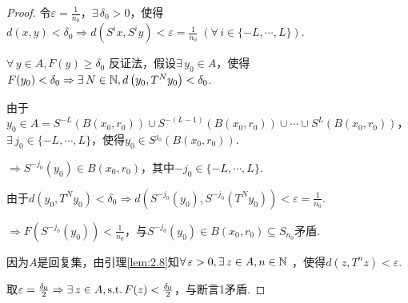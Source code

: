 \begin{proof}
    令$\varepsilon=\frac{1}{n_0}$，$\exists\,\delta_0>0$，使得$d(x,y)<\delta_0\Rightarrow d \left(S^ix,S^iy\right)<\varepsilon=\frac{1}{n_0}\;(\forall\, i\in\{-L,\cdots,L\})$.\par
    \begin{claim}{$\forall\,y\in A,F(y)\geq \delta_0$}
        反证法，假设$\exists\, y_0\in A$，使得$F(y_0)<\delta_0\Rightarrow \exists\, N\in\mathbb{N},d \left(y_0,T^Ny_0\right)<\delta_0$.\par
        由于$y_0\in A=S^{-L}\left(B(x_0,r_0)\right)\cup S^{-(L-1)}\left(B(x_0,r_0)\right)\cup\cdots\cup S^{L}\left(B(x_0,r_0)\right)$，$\exists\, j_0\in\{-L,\cdots,L\}$，使得$y_0\in S^{j_0}\left(B(x_0,r_0)\right)$.\par
        $\Rightarrow S^{-j_0}(y_0)\in B(x_0,r_0)$，其中$-j_0\in \{-L,\cdots,L\}$.\par
        由于$d \left(y_0,T^Ny_0\right)<\delta_0\Rightarrow d \left(S^{-j_0}(y_0),S^{-j_0}\left(T^Ny_0\right)\right)<\varepsilon=\frac{1}{n_0}$.\par
        $\Rightarrow F \left(S^{-j_0}(y_0)\right)<\frac{1}{n_0}$，与$S^{-j_0}(y_0)\in B(x_0,r_0)\subseteq S_{n_0}$矛盾.
    \end{claim}\par
    因为$A$是回复集，由引理\ref{lem:2.8}知$\forall\, \varepsilon>0,\exists\, z\in A,n\in\mathbb{N}$ ，使得$d \left(z,T^nz\right)<\varepsilon$.\par
    取$\varepsilon=\frac{\delta_0}{2}\Rightarrow \exists\, z\in A,\operatorname{\text{s.t.}} F(z)<\frac{\delta_0}{2}$，与断言1矛盾.
\end{proof}

